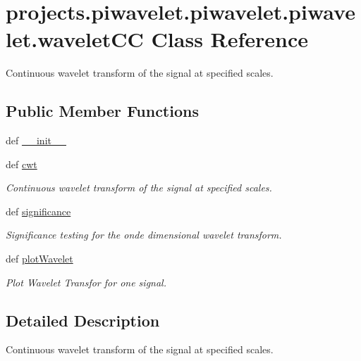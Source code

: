 \hypertarget{classprojects_1_1piwavelet_1_1piwavelet_1_1piwavelet_1_1waveletCC}{\section{projects.\-piwavelet.\-piwavelet.\-piwavelet.\-wavelet\-C\-C Class Reference}
\label{classprojects_1_1piwavelet_1_1piwavelet_1_1piwavelet_1_1waveletCC}
}


Continuous wavelet transform of the signal at specified scales.  


\subsection*{Public Member Functions}
\begin{DoxyCompactItemize}
\item 
def \hyperlink{classprojects_1_1piwavelet_1_1piwavelet_1_1piwavelet_1_1waveletCC_a885ea1bb4634fbc97df02be9d6b8258c}{\-\_\-\-\_\-init\-\_\-\-\_\-}
\item 
def \hyperlink{classprojects_1_1piwavelet_1_1piwavelet_1_1piwavelet_1_1waveletCC_ac76167e3fb082cde4b9568c1f432fd18}{cwt}
\begin{DoxyCompactList}\small\item\em Continuous wavelet transform of the signal at specified scales. \end{DoxyCompactList}\item 
def \hyperlink{classprojects_1_1piwavelet_1_1piwavelet_1_1piwavelet_1_1waveletCC_a7affb5a5af29583d05685578e5092309}{significance}
\begin{DoxyCompactList}\small\item\em Significance testing for the onde dimensional wavelet transform. \end{DoxyCompactList}\item 
def \hyperlink{classprojects_1_1piwavelet_1_1piwavelet_1_1piwavelet_1_1waveletCC_ab67499a934256a72d0daf3ce1139a994}{plot\-Wavelet}
\begin{DoxyCompactList}\small\item\em Plot Wavelet Transfor for one signal. \end{DoxyCompactList}\end{DoxyCompactItemize}


\subsection{Detailed Description}
Continuous wavelet transform of the signal at specified scales. 

